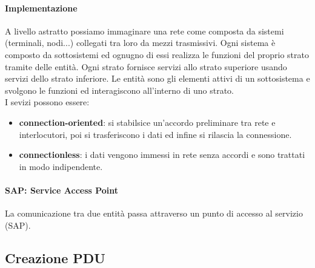 \documentclass[12pt]{article}
\begin{document}
\paragraph{Implementazione}
A livello astratto possiamo immaginare una rete come composta da sistemi (terminali, nodi...) collegati tra loro da mezzi trasmissivi. Ogni sistema è composto da sottosistemi ed ognugno di essi realizza le funzioni del proprio strato tramite delle entità. Ogni strato fornisce servizi allo strato superiore usando servizi dello strato inferiore. Le entità sono gli elementi attivi di un sottosistema e svolgono le funzioni ed interagiscono all'interno di uno strato.\\
I sevizi possono essere:
\begin{itemize}
  \item \textbf{connection-oriented}: si stabilsice un'accordo preliminare tra rete e interlocutori, poi si trasferiscono i dati ed infine si rilascia la connessione.
  \item \textbf{connectionless}: i dati vengono immessi in rete senza accordi e sono trattati in modo indipendente.
\end{itemize}

\paragraph{SAP: Service Access Point}
La comunicazione tra due entità passa attraverso un punto di accesso al servizio (SAP).

\subsection{Creazione PDU} %





\end{document}
